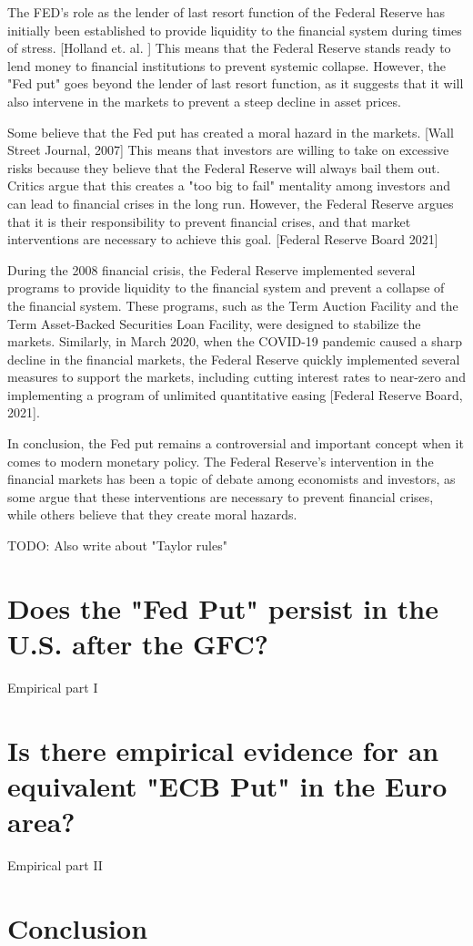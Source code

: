 The FED's role as the lender of last resort function of the Federal Reserve has initially been established to provide liquidity to the financial system during times of stress.  [Holland et.  al. ] 
This means that the Federal Reserve stands ready to lend money to financial institutions to prevent systemic collapse. 
However, the "Fed put" goes beyond the lender of last resort function,  as it suggests that it will also intervene in the markets to prevent a steep decline in asset prices.

Some believe that the Fed put has created a moral hazard in the markets.  [Wall Street Journal,  2007] 
This means that investors are willing to take on excessive risks because they believe that the Federal Reserve will always bail them out.  Critics argue that this creates a "too big to fail" mentality among investors and can lead to financial crises in the long run. 
However, the Federal Reserve argues that it is their responsibility to prevent financial crises,  and that market interventions are necessary to achieve this goal.  [Federal Reserve Board 2021]

During the 2008 financial crisis,  the Federal Reserve implemented several programs to provide liquidity to the financial system and prevent a collapse of the financial system. 
These programs,  such as the Term Auction Facility and the Term Asset-Backed Securities Loan Facility,  were designed to stabilize the markets.  
Similarly,  in March 2020, when the COVID-19 pandemic caused a sharp decline in the financial markets,  the Federal Reserve quickly implemented several measures to support the markets,  including cutting interest rates to near-zero and implementing a program of unlimited quantitative easing [Federal Reserve Board,  2021].

In conclusion,  the Fed put remains a controversial and important concept when it comes to modern monetary policy.   
The Federal Reserve's intervention in the financial markets has been a topic of debate among economists and investors,  as some argue that these interventions are necessary to prevent financial crises,  while others believe that they create moral hazards. 




TODO: Also write about "Taylor rules"

\chapter{Does the "Fed Put" persist in the U.S.  after the GFC?}

Empirical part I

\chapter{Is there empirical evidence for an equivalent "ECB Put" in the Euro area?}

Empirical part II

\chapter{Conclusion}


